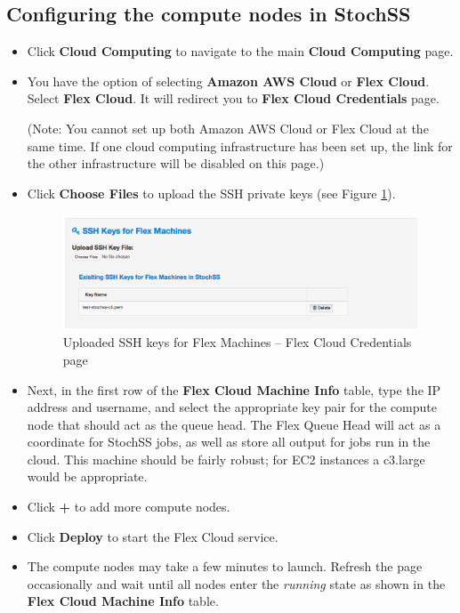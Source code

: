 \subsection{Configuring the compute nodes in StochSS}

\begin{itemize}
\item Click \textbf{Cloud Computing} to navigate to the main \textbf{Cloud Computing} page.
\item You have the option of selecting \textbf{Amazon AWS Cloud} or \textbf{Flex Cloud}. Select \textbf{Flex Cloud}. It will redirect you to \textbf{Flex Cloud Credentials} page. 

(Note: You cannot set up both Amazon AWS Cloud or Flex Cloud at the same time. If one cloud computing infrastructure has been set up, the link for the other infrastructure will be disabled on this page.)


\item Click \textbf{Choose Files} to upload the SSH private keys (see Figure \ref{fig:2}).

\begin{figure}[!ht]
\centering
\includegraphics[scale=0.45]{T7/T7_fig_flex_uploaded_ssh_keys.png}
\caption{Uploaded SSH keys for Flex Machines -- Flex Cloud Credentials page}
\label{fig:2}
\end{figure}

\item Next, in the first row of the \textbf{Flex Cloud Machine Info} table, type the IP address and username, and select the appropriate key pair for the compute node that should act as the queue head. The Flex Queue Head will act as a coordinate for StochSS jobs, as well as store all output for jobs run in the cloud. This machine should be fairly robust; for EC2 instances a c3.large would be appropriate.
\item Click \textbf{+} to add more compute nodes. %
\item Click \textbf{Deploy} to start the Flex Cloud service.
\item The compute nodes may take a few minutes to launch. Refresh the page occasionally and wait until all nodes enter the \emph{running} state as shown in the \textbf{Flex Cloud Machine Info} table.


\end{itemize}
